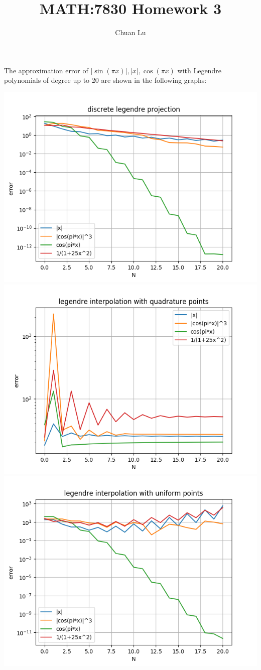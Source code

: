 \documentclass{article}
\begin{document}
\author{Chuan Lu}
\title{MATH:7830 Homework 3}
\maketitle


The approximation error of $|\sin(\pi x)|, |x|, \cos(\pi x)$ with Legendre polynomials of degree up to 20 are shown in the following graphs:

\includegraphics[scale=0.8]{1.png}
\includegraphics[scale=0.8]{2.png}
\includegraphics[scale=0.8]{3.png}
\end{document}
